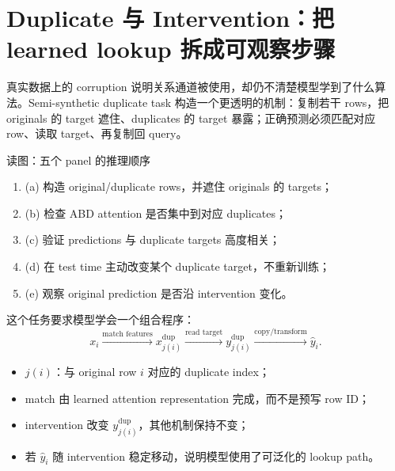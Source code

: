 \section{Duplicate 与 Intervention：把 learned lookup 拆成可观察步骤}

真实数据上的 corruption 说明关系通道被使用，却仍不清楚模型学到了什么算法。Semi-synthetic duplicate task 构造一个更透明的机制：复制若干 rows，把 originals 的 target 遮住、duplicates 的 target 暴露；正确预测必须匹配对应 row、读取 target、再复制回 query。


\begin{knowledgebox}{读图：五个 panel 的推理顺序}
\begin{enumerate}
  \item (a) 构造 original/duplicate rows，并遮住 originals 的 targets；
  \item (b) 检查 ABD attention 是否集中到对应 duplicates；
  \item (c) 验证 predictions 与 duplicate targets 高度相关；
  \item (d) 在 test time 主动改变某个 duplicate target，不重新训练；
  \item (e) 观察 original prediction 是否沿 intervention 变化。
\end{enumerate}
\end{knowledgebox}

这个任务要求模型学会一个组合程序：
\[
x_i\xrightarrow{\text{match features}}
x_{j(i)}^{\mathrm{dup}}
\xrightarrow{\text{read target}}
y_{j(i)}^{\mathrm{dup}}
\xrightarrow{\text{copy/transform}}
\widehat y_i.
\]

\begin{itemize}
  \item $j(i)$：与 original row $i$ 对应的 duplicate index；
  \item match 由 learned attention representation 完成，而不是预写 row ID；
  \item intervention 改变 $y_{j(i)}^{\mathrm{dup}}$，其他机制保持不变；
  \item 若 $\widehat y_i$ 随 intervention 稳定移动，说明模型使用了可泛化的 lookup path。
\end{itemize}


